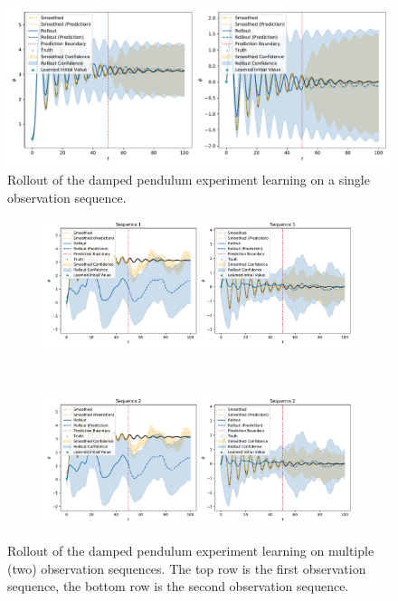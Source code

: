 	\begin{figure}
		\centering
		\includegraphics[width=\linewidth]{figures/results/single-vs-multi-sequence/pendulum-damped-single/rollout-observations-N0.pdf}
		\caption[Rollout of the damped pendulum experiment learning on a single observation sequence]{Rollout of the damped pendulum experiment learning on a single observation sequence.}
		\label{fig:plotsSingleSequence}
	\end{figure}
	\begin{figure}
		\centering
		\begin{subfigure}{\linewidth}
			\includegraphics[width=\linewidth]{figures/results/single-vs-multi-sequence/pendulum-damped-multi/rollout-observations-N0.pdf}
		\end{subfigure} \\
		\begin{subfigure}{\linewidth}
			\includegraphics[width=\linewidth]{figures/results/single-vs-multi-sequence/pendulum-damped-multi/rollout-observations-N1.pdf}
		\end{subfigure}
		\caption[Rollout of the damped pendulum experiment learning on two observation sequences]{Rollout of the damped pendulum experiment learning on multiple (two) observation sequences. The top row is the first observation sequence, the bottom row is the second observation sequence.}
		\label{fig:plotsMultiSequence}
	\end{figure}

